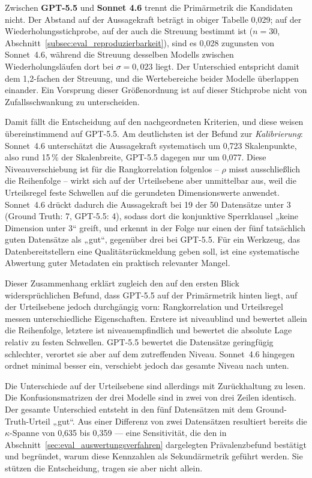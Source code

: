 Zwischen \textbf{GPT-5.5} und \textbf{Sonnet 4.6} trennt die Primärmetrik die Kandidaten
nicht. Der Abstand auf der Aussagekraft beträgt in obiger Tabelle 0,029; auf der
Wiederholungsstichprobe, auf der auch die Streuung bestimmt ist ($n = 30$,
Abschnitt~\ref{subsec:eval_reproduzierbarkeit}), sind es 0,028 zugunsten von Sonnet~4.6, während die Streuung desselben
Modells zwischen Wiederholungsläufen dort bei $\sigma = 0{,}023$ liegt. Der Unterschied
entspricht damit dem 1,2-fachen der Streuung, und die Wertebereiche beider Modelle
überlappen einander. Ein Vorsprung dieser Größenordnung ist
auf dieser Stichprobe nicht von Zufallsschwankung zu unterscheiden.

Damit fällt die Entscheidung auf den nachgeordneten Kriterien, und diese weisen
übereinstimmend auf GPT-5.5. Am deutlichsten ist der Befund zur \emph{Kalibrierung}:
Sonnet~4.6 unterschätzt die Aussagekraft systematisch um 0,723 Skalenpunkte, also rund
15\,\% der Skalenbreite, GPT-5.5 dagegen nur um 0,077. Diese Niveauverschiebung ist für
die Rangkorrelation folgenlos -- $\rho$ misst ausschließlich die Reihenfolge -- wirkt
sich auf der Urteilsebene aber unmittelbar aus, weil die Urteilsregel feste Schwellen auf
die gerundeten Dimensionswerte anwendet. Sonnet~4.6 drückt dadurch die Aussagekraft bei
19 der 50 Datensätze unter 3 (Ground Truth: 7, GPT-5.5: 4), sodass dort die konjunktive
Sperrklausel „keine Dimension unter 3“ greift, und erkennt in der Folge nur einen der fünf
tatsächlich guten Datensätze als „gut“, gegenüber drei bei GPT-5.5. Für ein Werkzeug, das Datenbereitstellern eine Qualitätsrückmeldung geben soll,
ist eine systematische Abwertung guter Metadaten ein praktisch relevanter Mangel.

Dieser Zusammenhang erklärt zugleich den auf den ersten Blick widersprüchlichen Befund,
dass GPT-5.5 auf der Primärmetrik hinten liegt, auf der Urteilsebene jedoch durchgängig
vorn: Rangkorrelation und Urteilsregel messen unterschiedliche Eigenschaften. Erstere ist
niveaublind und bewertet allein die Reihenfolge, letztere ist niveauempfindlich und
bewertet die absolute Lage relativ zu festen Schwellen. GPT-5.5 bewertet die Datensätze
geringfügig schlechter, verortet sie aber auf dem zutreffenden Niveau. Sonnet~4.6 hingegen ordnet
minimal besser ein, verschiebt jedoch das gesamte Niveau nach unten.

Die Unterschiede auf der Urteilsebene sind allerdings mit Zurückhaltung zu lesen. Die
Konfusionsmatrizen der drei Modelle sind in zwei von drei Zeilen identisch. Der gesamte
Unterschied entsteht in den fünf Datensätzen mit dem Ground-Truth-Urteil „gut“. Aus einer
Differenz von zwei Datensätzen resultiert bereits die $\kappa$-Spanne von 0,635 bis 0,359
--- eine Sensitivität, die den in Abschnitt~\ref{sec:eval_auswertungsverfahren} dargelegten Prävalenzbefund bestätigt und
begründet, warum diese Kennzahlen als Sekundärmetrik geführt werden. Sie stützen die
Entscheidung, tragen sie aber nicht allein.

